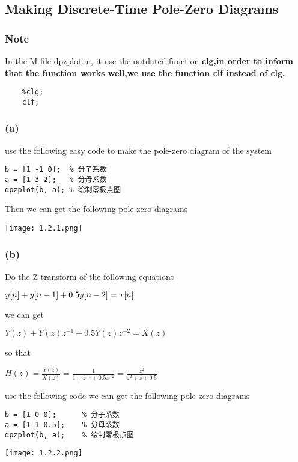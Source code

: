 \documentclass{article}
\begin{document}
\subsection{Making Discrete-Time Pole-Zero Diagrams}

\subsubsection*{Note}

In the M-file dpzplot.m, it use the outdated function \bf{clg},in order to inform that the function works well,we use the function \bf{clf} instead of \bf{clg}.\\
\begin{lstlisting}
    %clg;
    clf;
\end{lstlisting}

\subsubsection*{(a)}
use the following easy code to make the pole-zero diagram of the system
\begin{lstlisting}
b = [1 -1 0];  % 分子系数
a = [1 3 2];   % 分母系数
dpzplot(b, a); % 绘制零极点图
\end{lstlisting}
Then we can get the following pole-zero diagrams
\begin{center}
    \texttt{[image: 1.2.1.png]}
\end{center}

\subsubsection*{(b)}

Do the Z-transform of the following equations
\begin{center}
    \begin{math}
        \centering
        y[n] +y[n-1] + 0.5y[n-2] = x[n]
    \end{math}
\end{center}
we can get
\begin{center}
    \begin{math}
        Y(z) + Y(z)z^{-1} + 0.5Y(z)z^{-2} = X(z)
    \end{math}
\end{center}
so that
\begin{center}
    \begin{math}
        H(z) = \frac{Y(z)}{X(z)} = \frac{1}{1+z^{-1}+0.5z^{-2}} = \frac{z^2}{z^2+z+0.5}
    \end{math}
\end{center}
use the following code we can get the following pole-zero diagrams
\begin{lstlisting}
b = [1 0 0];      % 分子系数
a = [1 1 0.5];    % 分母系数
dpzplot(b, a);    % 绘制零极点图
\end{lstlisting}
\begin{center}
    \texttt{[image: 1.2.2.png]}
\end{center}
\end{document}
